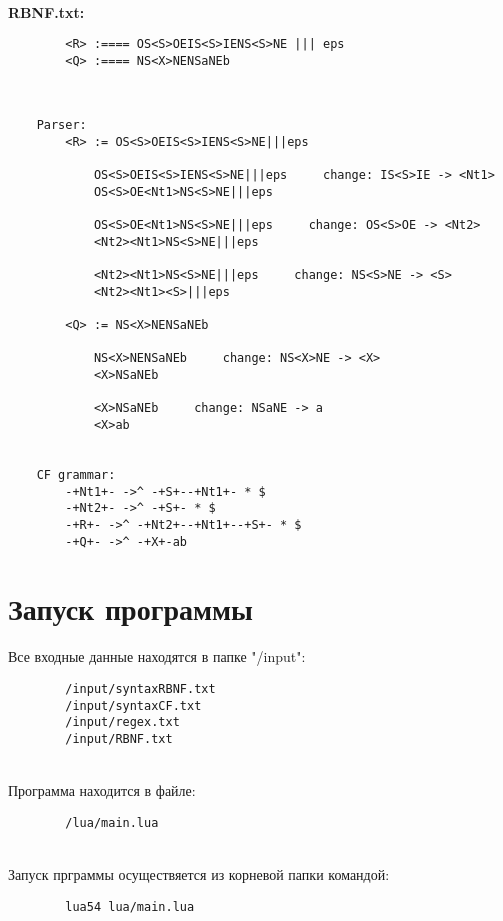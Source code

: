\documentclass[12pt]{article}
\begin{document}
    \hfill \\
    {\bfseries RBNF.txt:}
    \begin{lstlisting}
        <R> :==== OS<S>OEIS<S>IENS<S>NE ||| eps
        <Q> :==== NS<X>NENSaNEb
    \end{lstlisting}

    \hfill \\
    \begin{lstlisting}
    Parser:
        <R> := OS<S>OEIS<S>IENS<S>NE|||eps

            OS<S>OEIS<S>IENS<S>NE|||eps     change: IS<S>IE -> <Nt1>
            OS<S>OE<Nt1>NS<S>NE|||eps

            OS<S>OE<Nt1>NS<S>NE|||eps     change: OS<S>OE -> <Nt2>
            <Nt2><Nt1>NS<S>NE|||eps

            <Nt2><Nt1>NS<S>NE|||eps     change: NS<S>NE -> <S>
            <Nt2><Nt1><S>|||eps

        <Q> := NS<X>NENSaNEb

            NS<X>NENSaNEb     change: NS<X>NE -> <X>
            <X>NSaNEb

            <X>NSaNEb     change: NSaNE -> a
            <X>ab


    CF grammar:
        -+Nt1+- ->^ -+S+--+Nt1+- * $
        -+Nt2+- ->^ -+S+- * $
        -+R+- ->^ -+Nt2+--+Nt1+--+S+- * $
        -+Q+- ->^ -+X+-ab

    \end{lstlisting}

    \clearpage


    \section{Запуск программы}

    Все входные данные находятся в папке "/input":
    \begin{lstlisting}
        /input/syntaxRBNF.txt
        /input/syntaxCF.txt
        /input/regex.txt
        /input/RBNF.txt
    \end{lstlisting}

    \hfill \\
    Программа находится в файле:
    \begin{lstlisting}
        /lua/main.lua
    \end{lstlisting}

    \hfill \\
    Запуск прграммы осуществяется из корневой папки командой:
    \begin{lstlisting}
        lua54 lua/main.lua
    \end{lstlisting}
\end{document}
